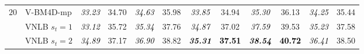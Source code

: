 \documentclass[10pt, a4paper]{article}
\newcommand{\bsic}[1]{\textcolor{black}{\textit{#1}}}
\newcommand{\Bsic}[1]{\textcolor{black}{\textbf{\textit{#1}}}}
\newcommand{\Best}[1]{\textbf{\textcolor{black}{#1}}}
\begin{document}
\begin{table}[htp!]
\begin{center}
{\begin{tabular}{ c | l |c c | c c | c c | c c | c c}
%
			\multirow{1}{*}{$20$}
			                      & V-BM4D-mp            & \bsic{33.23} &       34.70  & \bsic{34.63} &       35.98  & \bsic{33.85} &       34.94  & \bsic{35.30} &       36.13  & \bsic{34.25} &       35.44  \\
			                      & VNLB   $s_t = 1$     & \bsic{33.12} &       35.72  & \bsic{35.34} &       37.76  & \bsic{34.87} &       37.02  & \bsic{37.59} &       39.53  & \bsic{35.23} &       37.58  \\
			                      & VNLB   $s_t = 2$     & \bsic{34.89} &       37.17  & \bsic{36.90} &       38.82  & \Bsic{35.31} & \Best{37.51} & \Bsic{38.54} & \Best{40.72} & \bsic{36.41} &       38.50  \\

\end{tabular}}
\end{center}
\end{table}
\end{document}
